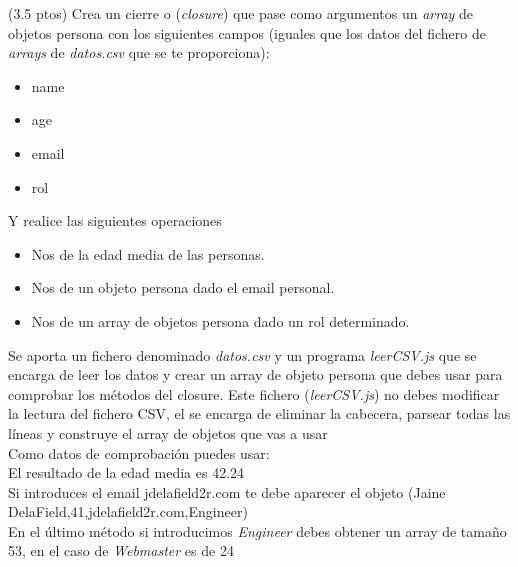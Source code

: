 \documentclass[addpoints,12pt]{exam}
\begin{document}
\begin{center}
\end{center}
\vspace{0.1in}
\begin{questions}
\question(3.5 ptos) Crea un cierre o (\emph{closure}) que pase como argumentos un \emph{array} de objetos persona con los siguientes campos (iguales que los datos del fichero de \emph{arrays} de \emph{datos.csv} que se te proporciona):
\begin{itemize}
\item name
\item age
\item email
\item rol
\end{itemize}
Y realice las siguientes operaciones
\begin{itemize}
\item Nos de la edad media de las personas.
\item Nos de un objeto persona dado el email personal.
\item Nos de un array de objetos persona dado un rol determinado.
\end{itemize}
Se aporta un fichero denominado \emph{datos.csv} y un programa \emph{leerCSV.js} que se encarga de leer los datos y crear un array de objeto persona que debes usar para comprobar los métodos del closure. Este fichero (\emph{leerCSV.js}) no debes modificar la lectura del fichero CSV, el se encarga de eliminar la cabecera, parsear todas las líneas y construye el array de objetos que vas a usar\\
Como datos de comprobación puedes usar:\\
El resultado de la edad media es 42.24\\
Si introduces el email jdelafield2r\@facebook.com te debe aparecer el objeto (Jaine DelaField,41,jdelafield2r\@facebook.com,Engineer)\\
En el último método si introducimos \emph{Engineer} debes obtener un array de tamaño 53, en el caso de \emph{Webmaster} es de 24


\end{questions}
\end{document}
